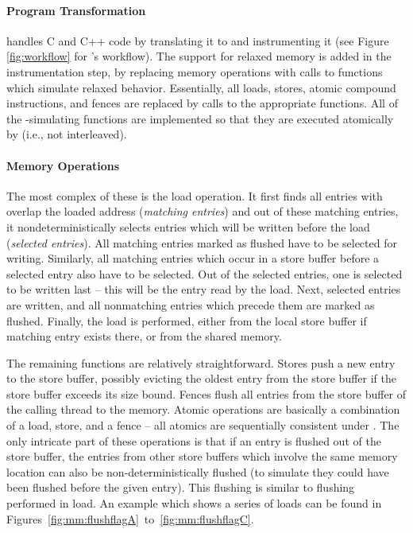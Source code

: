 \paragraph{Program Transformation}%
%
\divine handles C and C++ code by translating it to \llvm and instrumenting it (see Figure \ref{fig:workflow} for \divine's workflow).
The support for relaxed memory is added in the instrumentation step, by replacing memory operations with calls to functions which simulate relaxed behavior.
Essentially, all loads, stores, atomic compound instructions, and fences are replaced by calls to the appropriate functions.
All of the \xtso-simulating functions are implemented so that they are executed atomically by \divine (i.e., not interleaved).

\paragraph{\xtso Memory Operations}
%
The most complex of these is the load operation.
It first finds all entries with overlap the loaded address (\emph{matching entries}) and out of these matching entries, it nondeterministically selects entries which will be written before the load (\emph{selected entries}).
All matching entries marked as flushed have to be selected for writing.
Similarly, all matching entries which occur in a store buffer before a selected entry also have to be selected.
Out of the selected entries, one is selected to be written last -- this will be the entry read by the load.
Next, selected entries are written, and all nonmatching entries which precede them are marked as flushed.
Finally, the load is performed, either from the local store buffer if matching
entry exists there, or from the shared memory.

The remaining functions are relatively straightforward.
Stores push a new entry to the store buffer, possibly evicting the oldest entry
from the store buffer if the store buffer exceeds its size bound.
Fences flush all entries from the store buffer of the calling thread to the
memory.
Atomic operations are basically a combination of a load, store, and a fence --
all atomics are sequentially consistent under \xtso.
The only intricate part of these operations is that if an entry is flushed out
of the store buffer, the entries from other store buffers which involve the
same memory location can also be non-deterministically flushed (to simulate
they could have been flushed before the given entry).
This flushing is similar to flushing performed in load.
An example which shows a series of loads can be found in Figures~\ref{fig:mm:flushflagA}~to~\ref{fig:mm:flushflagC}.

